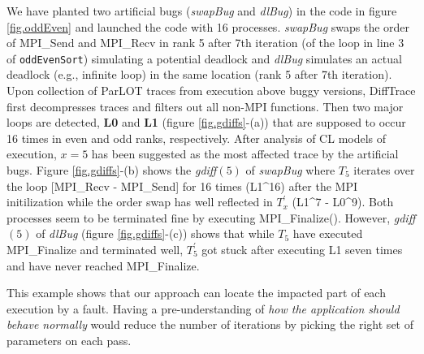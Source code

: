 %
We have planted two artificial bugs (\textit{swapBug} and \textit{dlBug}) in the code in figure \ref{fig.oddEven} and launched the code with 16 processes.
%
\textit{swapBug} swaps the order of MPI\_Send and MPI\_Recv in rank 5 after 7th iteration (of the loop in line 3 of \texttt{oddEvenSort}) simulating a potential deadlock and \textit{dlBug} simulates an actual deadlock (e.g., infinite loop) in the same location (rank 5 after 7th iteration).
%
Upon collection of ParLOT traces from execution above buggy versions, DiffTrace first decompresses traces and filters out all non-MPI functions.
Then two major loops are detected, \textbf{L0} and \textbf{L1}  (figure \ref{fig.gdiffs}-(a)) that are supposed to occur 16 times in even and odd ranks, respectively.
After analysis of CL models of execution, $x=5$ has been suggested as the most affected trace by the artificial bugs.
Figure \ref{fig.gdiffs}-(b) shows the 
\textit{gdiff}$(5)$ of \textit{swapBug} where $T_5$ iterates over the loop [MPI\_Recv - MPI\_Send] for 16 times (L1\^{}16) after the MPI initilization while the order swap has well reflected in $T_x^\prime$ (L1\^{}7 - L0\^{}9). Both processes seem to be terminated fine by executing MPI\_Finalize(). 
However, \textit{gdiff}$(5)$ of \textit{dlBug} (figure \ref{fig.gdiffs}-(c)) shows that while $T_5$ have executed MPI\_Finalize and terminated well, $T_5^\prime$ got stuck after executing L1 seven times and have never reached MPI\_Finalize.

This example shows that our approach can locate the impacted part of each execution by a fault. Having a pre-understanding of \textit{how the application should behave normally} would reduce the number of iterations by picking the right set of parameters on each pass. 





%
